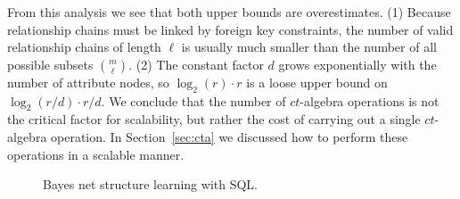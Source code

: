 \documentclass{vldb}
\newcommand{\ct}{\mathit{ct}}
\begin{document}
From this analysis we see that both upper bounds are overestimates. (1) Because relationship chains must be linked by foreign key constraints, the number of valid relationship chains of length $\ell$ is usually much smaller than the number of all possible subsets ${m\choose \ell}$. (2) The constant factor $d$ grows exponentially with the number of attribute nodes, so $\log_{2}(r) \cdot r$ is a loose upper bound on $\log_{2} (r/d) \cdot r/d$. 
We conclude that the number of $\ct$-algebra operations is not the critical factor for scalability, but rather the cost of %
carrying out a single $\ct$-algebra operation. 
In Section~\ref{sec:cta} we discussed how to perform these operations in a scalable manner.
%
%

\begin{figure}[tbp]
\begin{center}
\caption{Bayes net structure learning with SQL.
\label{fig:general-flow-chart}}
\end{center}
\end{figure}
\end{document}
